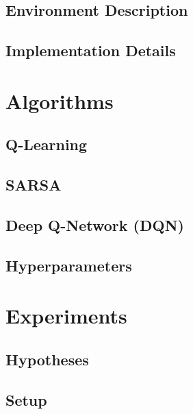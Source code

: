 \documentclass[a4paper,11pt]{article}
\theoremstyle{definition}
\begin{document}
\subsection{Environment Description}

\subsection{Implementation Details}


\section{Algorithms}

\subsection{Q-Learning}

\subsection{SARSA}
%

\subsection{Deep Q-Network (DQN)}


\subsection{Hyperparameters}


\section{Experiments}

\subsection{Hypotheses}

\subsection{Setup}
\end{document}
